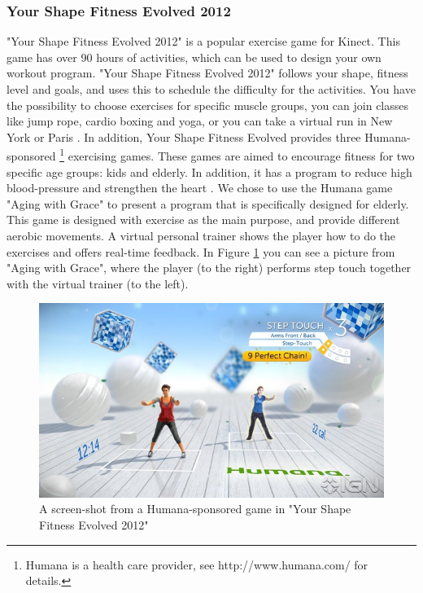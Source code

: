 \subsubsection{Your Shape Fitness Evolved 2012}
"Your Shape Fitness Evolved 2012" is a popular exercise game for Kinect. This game has over 90 hours of activities, which can be used to design your own workout program. "Your Shape Fitness Evolved 2012" follows your shape, fitness level and goals, and uses this to schedule the difficulty for the activities. You have the possibility to choose exercises for specific muscle groups, you can join classes like jump rope, cardio boxing and yoga, or you can take a virtual run in New York or Paris \cite{yourshape}. In addition, Your Shape Fitness Evolved provides three Humana-sponsored \footnote{Humana is a health care provider, see http://www.humana.com/ for details.} exercising games. These games are aimed to encourage fitness for two specific age groups: kids and elderly. In addition, it has a program to reduce high blood-pressure and strengthen the heart \cite{ptspill}. We chose to use the Humana game "Aging with Grace" to present a program that is specifically designed for elderly. This game is designed with exercise as the main purpose, and provide different aerobic movements. A virtual personal trainer shows the player how to do the exercises and offers real-time feedback. In Figure \ref{fig:ptspill} you can see a picture from "Aging with Grace", where the player (to the right) performs step touch together with the virtual trainer (to the left). 

\begin{figure} [H]
\centering
\includegraphics[scale=0.5]{ptspill}
\caption[Your Shape Fitness Evolved 2012]{A screen-shot from a Humana-sponsored game in "Your Shape Fitness Evolved 2012" \cite{ptspill}}
\label{fig:ptspill}
\end{figure}

